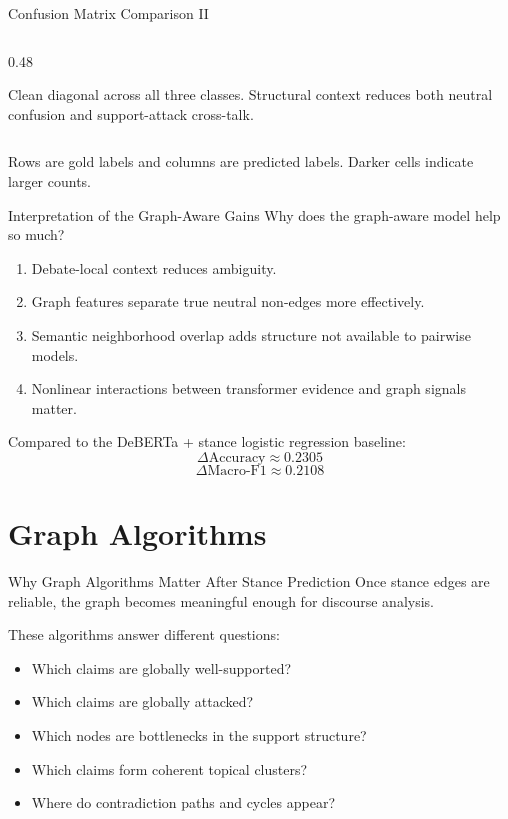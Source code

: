 \documentclass[aspectratio=169]{beamer}
\begin{document}
\begin{frame}[shrink=4]{Confusion Matrix Comparison II}
\begin{columns}[T]
\begin{column}{0.48\textwidth}
    \vspace{0.1cm}

    \scriptsize Clean diagonal across all three classes. Structural context reduces both neutral confusion and support-attack cross-talk.
  \end{column}
\end{columns}

\vspace{0.25cm}
\small Rows are gold labels and columns are predicted labels. Darker cells indicate larger counts.
\end{frame}

\begin{frame}{Interpretation of the Graph-Aware Gains}
Why does the graph-aware model help so much?
\begin{enumerate}
  \item Debate-local context reduces ambiguity.
  \item Graph features separate true neutral non-edges more effectively.
  \item Semantic neighborhood overlap adds structure not available to pairwise models.
  \item Nonlinear interactions between transformer evidence and graph signals matter.
\end{enumerate}

Compared to the DeBERTa + stance logistic regression baseline:
\[
\Delta \text{Accuracy} \approx 0.2305
\]
\[
\Delta \text{Macro-F1} \approx 0.2108
\]
\end{frame}

\section{Graph Algorithms}

\begin{frame}{Why Graph Algorithms Matter After Stance Prediction}
Once stance edges are reliable, the graph becomes meaningful enough for discourse analysis.

These algorithms answer different questions:
\begin{itemize}
  \item Which claims are globally well-supported?
  \item Which claims are globally attacked?
  \item Which nodes are bottlenecks in the support structure?
  \item Which claims form coherent topical clusters?
  \item Where do contradiction paths and cycles appear?
\end{itemize}
\end{frame}
\end{document}
